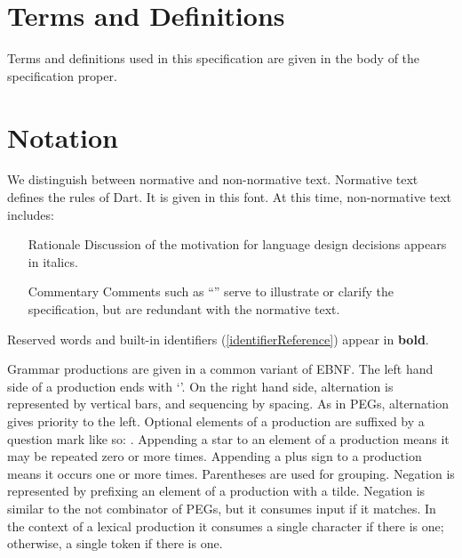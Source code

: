 \documentclass[makeidx]{article}
\begin{document}
\section{Terms and Definitions}

\LMHash{}%
Terms and definitions used in this specification are given in
the body of the specification proper.


\section{Notation}

\LMHash{}%
We distinguish between normative and non-normative text.
Normative text defines the rules of Dart.
It is given in this font.
At this time, non-normative text includes:

\begin{itemize}
\item[Rationale]
  Discussion of the motivation for language design decisions appears in italics.
\item[Commentary]
  Comments such as
  ``''
  serve to illustrate or clarify the specification,
  but are redundant with the normative text.
\end{itemize}

\LMHash{}%
Reserved words and built-in identifiers
(\ref{identifierReference})
appear in {\bf bold}.


\LMHash{}%
Grammar productions are given in a common variant of EBNF.
The left hand side of a production ends with `\lit{::=}'.
On the right hand side, alternation is represented by vertical bars,
and sequencing by spacing.
As in PEGs, alternation gives priority to the left.
Optional elements of a production are suffixed by a question mark
like so: .
Appending a star to an element of a production means
it may be repeated zero or more times.
Appending a plus sign to a production means it occurs one or more times.
Parentheses are used for grouping.
Negation is represented by prefixing an element of a production with a tilde.
Negation is similar to the not combinator of PEGs,
but it consumes input if it matches.
In the context of a lexical production it consumes
a single character if there is one;
otherwise, a single token if there is one.
\end{document}
